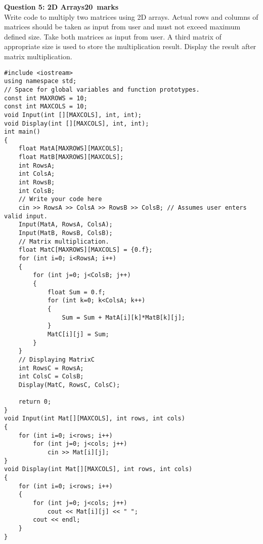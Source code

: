 \documentclass[12pt,a4paper]{article}
\def\Qfive{20}
\begin{document}
\newpage
\noindent\textbf{Question 5: 2D Arrays\hfill \Qfive~marks}\\
Write code to multiply two matrices using 2D arrays. Actual rows and columns of matrices should be taken as input from user and must not exceed maximum defined size. Take both matrices as input from user. A third matrix of appropriate size is used to store the multiplication result. Display the result after matrix multiplication.
\begin{lstlisting}
#include <iostream>
using namespace std;
// Space for global variables and function prototypes.
const int MAXROWS = 10;
const int MAXCOLS = 10;
void Input(int [][MAXCOLS], int, int);
void Display(int [][MAXCOLS], int, int);
int main()
{
	float MatA[MAXROWS][MAXCOLS];
	float MatB[MAXROWS][MAXCOLS];
	int RowsA;
	int ColsA;
	int RowsB;
	int ColsB;
	// Write your code here
	cin >> RowsA >> ColsA >> RowsB >> ColsB; // Assumes user enters valid input.
	Input(MatA, RowsA, ColsA);
	Input(MatB, RowsB, ColsB);
	// Matrix multiplication.
	float MatC[MAXROWS][MAXCOLS] = {0.f};
	for (int i=0; i<RowsA; i++)
	{
		for (int j=0; j<ColsB; j++)
		{
			float Sum = 0.f;
			for (int k=0; k<ColsA; k++)
			{
				Sum = Sum + MatA[i][k]*MatB[k][j];
			}
			MatC[i][j] = Sum;
		}
	}
	// Displaying MatrixC
	int RowsC = RowsA;
	int ColsC = ColsB;
	Display(MatC, RowsC, ColsC);

	return 0;
}
void Input(int Mat[][MAXCOLS], int rows, int cols)
{
	for (int i=0; i<rows; i++)
		for (int j=0; j<cols; j++)
			cin >> Mat[i][j];
}
void Display(int Mat[][MAXCOLS], int rows, int cols)
{
	for (int i=0; i<rows; i++)
	{
		for (int j=0; j<cols; j++)
			cout << Mat[i][j] << " ";
		cout << endl;
	}
}
\end{lstlisting}
\newpage~
\newpage
\end{document}
